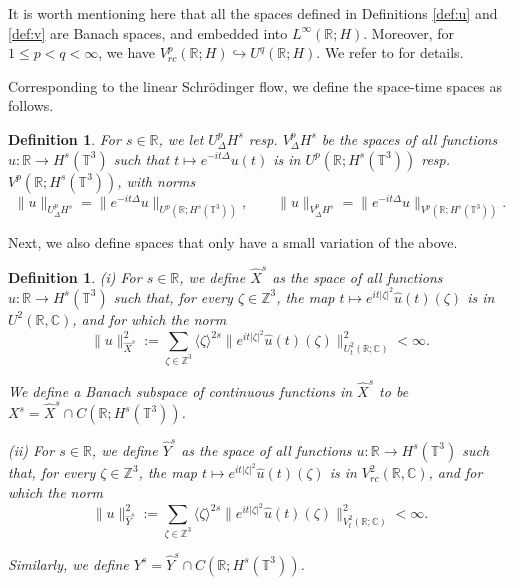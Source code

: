 \documentclass[letterpaper, 11pt,  reqno]{amsart}
\newtheorem{definition}[theorem]{Definition}
\newcommand{\1}{\hspace{0.5mm}\text{I}\hspace{0.5mm}}
\newcommand{\noi}{\noindent}
\newcommand{\Z}{\mathbb{Z}}
\newcommand{\R}{\mathbb{R}}
\newcommand{\C}{\mathbb{C}}
\newcommand{\T}{\mathbb{T}}
\newcommand{\ft}{\widehat}
\newcommand{\jb}[1]
{\langle #1 \rangle}
\numberwithin{equation}{section}
\numberwithin{theorem}{section}
\begin{document}
It is worth mentioning here that all the spaces defined in Definitions \ref{def:u} and \ref{def:v} are 
Banach spaces, and
embedded into   $L^\infty(\R;H)$.
Moreover, for  $1\leq p<q <\infty$,
we have $V^p_{rc}(\R;H) \hookrightarrow U^q(\R;H)$.
We refer to \cite{HHK09} for details.


Corresponding to the linear Schr\"odinger flow,
we define the space-time spaces as follows.



\begin{definition}\label{def:delta_norm}
\rm
For $s \in \R$, we let $U^p_\Delta H^s $ resp. $V^p_\Delta H^s$ 
be the spaces of all functions $u:\R\to H^s(\T^3)$ such that $t \mapsto e^{-it \Delta}u(t)$ is in $U^p(\R;H^s(\T^3))$ resp. $V^p(\R;H^s(\T^3))$, with norms
\[
    \| u\|_{U^p_\Delta H^s} = \| e^{-it \Delta} u\|_{U^p(\R;H^s(\T^3))},
    \qquad 
    \| u\|_{V^p_\Delta H^s} = \| e^{-it \Delta} u\|_{V^p(\R;H^s(\T^3))}.
\]
\end{definition}



Next, we also define spaces that only have a small variation of the above.



\begin{definition}\label{def:xt}
\rm
(i)
For $s \in \R$, we define $\ft X^{s}$ as the space of all functions $u: \R \to H^s(\T^3)$ 
such that, for every $\zeta \in \Z^3$, the map $t \mapsto e^{it|\zeta|^2} \ft{u}(t)(\zeta)$ is in $U^2(\R,\C)$, and for which the norm
\[
    \|u\|^2_{\ft X^{s}}:=\sum_{\zeta \in \Z^3} \jb{ \zeta } ^{2s}
    \|e^{it|\zeta|^2}\ft{u}(t)(\zeta)\|_{U^2_t(\R; \C)}^2<\infty.
\]


\noi
We define a Banach subspace of continuous functions in  $\ft X^{s}$
to be $X^s=\ft X^{s} \cap C(\R;H^s(\T^3))$.


\smallskip
(ii)
For $s \in \R$, we define $\ft Y^{s}$ as the space of all functions $u:\R \to H^s(\T^3)$ such that,
for every 
$\zeta\in \Z^3$, the map $t \mapsto e^{it|\zeta|^2}\ft u(t) (\zeta)$ is in $V^2_{rc}(\R,\C)$, and for which the norm
\[
    \|u\|^2_{\ft Y^{s}}
    :=\sum_{\zeta\in \Z^3}
    \jb{ \zeta } ^{2s} \|e^{it|\zeta|^2}\ft{u}(t)(\zeta)\|_{V^2_t (\R; \C)}^2 <\infty.
\]

\noi
Similarly, we define $Y^s=\ft Y^{s} \cap C(\R;H^s(\T^3))$.



\end{definition}
\end{document}
